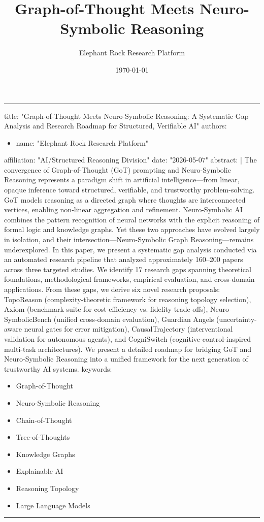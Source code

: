 \documentclass[11pt,a4paper]{article}
\title{Graph-of-Thought Meets Neuro-Symbolic Reasoning}
\author{Elephant Rock Research Platform}
\date{\today}
\begin{document}
\maketitle

\noindent\rule{\textwidth}{0.4pt}
title: "Graph-of-Thought Meets Neuro-Symbolic Reasoning: A Systematic Gap Analysis and Research Roadmap for Structured, Verifiable AI"
authors:
\begin{itemize}
  \item name: "Elephant Rock Research Platform"
\end{itemize}
    affiliation: "AI/Structured Reasoning Division"
date: "2026-05-07"
abstract: |
  The convergence of Graph-of-Thought (GoT) prompting and Neuro-Symbolic Reasoning represents a paradigm shift in artificial intelligence—from linear, opaque inference toward structured, verifiable, and trustworthy problem-solving. GoT models reasoning as a directed graph where thoughts are interconnected vertices, enabling non-linear aggregation and refinement. Neuro-Symbolic AI combines the pattern recognition of neural networks with the explicit reasoning of formal logic and knowledge graphs. Yet these two approaches have evolved largely in isolation, and their intersection—Neuro-Symbolic Graph Reasoning—remains underexplored. In this paper, we present a systematic gap analysis conducted via an automated research pipeline that analyzed approximately 160–200 papers across three targeted studies. We identify 17 research gaps spanning theoretical foundations, methodological frameworks, empirical evaluation, and cross-domain applications. From these gaps, we derive six novel research proposals: TopoReason (complexity-theoretic framework for reasoning topology selection), Axiom (benchmark suite for cost-efficiency vs. fidelity trade-offs), Neuro-SymbolicBench (unified cross-domain evaluation), Guardian Angels (uncertainty-aware neural gates for error mitigation), CausalTrajectory (interventional validation for autonomous agents), and CogniSwitch (cognitive-control-inspired multi-task architectures). We present a detailed roadmap for bridging GoT and Neuro-Symbolic Reasoning into a unified framework for the next generation of trustworthy AI systems.
keywords:
\begin{itemize}
  \item Graph-of-Thought
  \item Neuro-Symbolic Reasoning
  \item Chain-of-Thought
  \item Tree-of-Thoughts
  \item Knowledge Graphs
  \item Explainable AI
  \item Reasoning Topology
  \item Large Language Models
\end{itemize}
\noindent\rule{\textwidth}{0.4pt}
\end{document}
